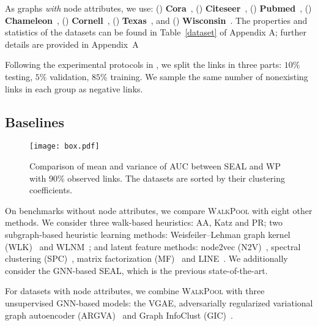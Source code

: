 \documentclass[11pt]{article}
\newcommand{\walkpool}{\textsc{WalkPool}\xspace}
\newcommand{\UPDATE}[1]{\textcolor{WowColor}{{#1}}}
\renewcommand{\UPDATE}[1]{#1}
\begin{document}
\UPDATE{As graphs \textit{with} node attributes, we use: (\romannumeral1) \textbf{Cora}~\citep{mccallum2000automating}, (\romannumeral2) \textbf{Citeseer}~\citep{giles1998citeseer}, (\romannumeral3) \textbf{Pubmed}~\citep{namata2012query}, (\romannumeral4) \textbf{Chameleon}~\citep{rozemberczki2021multi}, (\romannumeral5) \textbf{Cornell}~\citep{craven1998learning}, (\romannumeral6) \textbf{Texas}~\citep{craven1998learning}, and (\romannumeral7) \textbf{Wisconsin}~\citep{craven1998learning}. The properties and statistics of the datasets can be found in Table~\ref{dataset} of Appendix A; further details are provided in Appendix~A}

Following the experimental protocols in \citep{kipf2016variational,pan2018adversarially,mavromatis2020graph}, we split the links in three parts: $10\%$ testing, $5\%$ validation, $85\%$ training. We sample the same number of nonexisting links in each group as negative links.
\vspace{-4mm}
\subsection{Baselines}
\vspace{-4mm}
\begin{wrapfigure}{r}{0.5\textwidth} 
    \centering
    \vspace{-6mm}
    \texttt{[image: box.pdf]}
    \caption{ Comparison of  mean and variance of AUC between SEAL and WP with 90\% observed links.  The datasets are sorted by their clustering coefficients.}
    \label{fig:clustcoeffbox}
    \vspace{-4mm}
\end{wrapfigure}
On benchmarks without node attributes, we compare \walkpool with eight other methods.  We consider three walk-based heuristics: AA, Katz and PR; two subgraph-based heuristic learning methods: Weisfeiler--Lehman graph kernel (WLK)~\citep{shervashidze2011weisfeiler} and WLNM~\citep{zhang2017weisfeiler}; and latent feature methods: node2vec (N2V)~\citep{grover2016node2vec}, spectral clustering (SPC)~\citep{tang2011leveraging}, \UPDATE {matrix factorization (MF)~\citep{koren2009matrix} and LINE~\citep{tang2015line}}. We additionally consider the GNN-based SEAL, which is the previous state-of-the-art. 

For datasets with node attributes, we combine \walkpool with three unsupervised GNN-based models: the VGAE, adversarially regularized variational graph autoencoder (ARGVA)~\citep{pan2018adversarially} and Graph InfoClust (GIC)~\citep{mavromatis2020graph}.  
\end{document}
